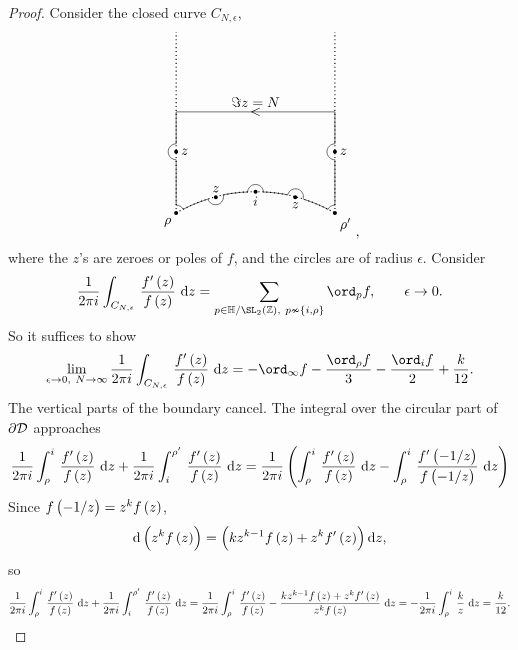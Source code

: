 \begin{proof}
Consider the closed curve $ C_{N, \epsilon} $,
$$
\begin{tikzpicture}[scale=4]
\draw [dotted, thick] (-0.5, 0.866) arc (120:60:1);
\draw [dotted, thick] (-0.5, 0.866) to (-0.5, 2);
\draw [dotted, thick] (0.5, 0.866) to (0.5, 2);
\draw (-0.5, 0.916) arc (90:25:0.05);
\draw (-0.455, 0.89) arc (117:107.5:1);
\draw (-0.3, 0.955) arc (-165:15:0.05);
\draw (-0.205, 0.98) arc (101:92:1);
\draw (-0.05, 0.995) arc (180:0:0.05);
\draw (0.205, 0.98) arc (79:88:1);
\draw (0.3, 0.955) arc (-15:165:0.05);
\draw (0.455, 0.89) arc (63:72.5:1);
\draw (0.5, 0.916) arc (90:155:0.05);
\draw (-0.5, 1.5) to node[above]{$ \Im z = N $} node{$ < $} (0.5, 1.5);
\draw (-0.5, 0.916) to (-0.5, 1.2);
\draw (-0.5, 1.2) arc (270:90:0.05);
\draw (-0.5, 1.3) to (-0.5, 1.5);
\draw (0.5, 0.916) to (0.5, 1.2);
\draw (0.5, 1.2) arc (270:90:0.05);
\draw (0.5, 1.3) to (0.5, 1.5);
\fill (0, 1) circle (0.0125) node[below]{$ i $};
\fill (-0.25, 0.965) circle (0.0125) node[above]{$ z $};
\fill (0.25, 0.965) circle (0.0125) node[below]{$ z $};
\fill (-0.5, 1.25) circle (0.0125) node[right]{$ z $};
\fill (-0.5, 0.866) circle (0.0125) node[below left]{$ \rho $};
\fill (0.5, 1.25) circle (0.0125) node[right]{$ z $};
\fill (0.5, 0.866) circle (0.0125) node[below right]{$ \rho' $};
\end{tikzpicture},
$$
where the $ z $'s are zeroes or poles of $ f $, and the circles are of radius $ \epsilon $. Consider
$$ \dfrac{1}{2\pi i}\intd{C_{N, \epsilon}}{}{\dfrac{f'\br{z}}{f\br{z}}}{z} = \sum_{p \in \HH / \SL_2\br{\ZZ}, \ p \nsim \cbr{i, \rho}} \ord_p f, \qquad \epsilon \to 0. $$
So it suffices to show
$$ \lim_{\epsilon \to 0, \ N \to \infty} \dfrac{1}{2\pi i}\intd{C_{N, \epsilon}}{}{\dfrac{f'\br{z}}{f\br{z}}}{z} = -\ord_\infty f - \dfrac{\ord_\rho f}{3} - \dfrac{\ord_i f}{2} + \dfrac{k}{12}. $$
The vertical parts of the boundary cancel. The integral over the circular part of $ \partial\mathcal{D} $ approaches
$$ \dfrac{1}{2\pi i}\intd{\rho}{i}{\dfrac{f'\br{z}}{f\br{z}}}{z} + \dfrac{1}{2\pi i}\intd{i}{\rho'}{\dfrac{f'\br{z}}{f\br{z}}}{z} = \dfrac{1}{2\pi i}\br{\intd{\rho}{i}{\dfrac{f'\br{z}}{f\br{z}}}{z} - \intd{\rho}{i}{\dfrac{f'\br{-1 / z}}{f\br{-1 / z}}}{z}} $$
Since $ f\br{-1 / z} = z^kf\br{z} $,
$$ \d\br{z^kf\br{z}} = \br{kz^{k - 1}f\br{z} + z^kf'\br{z}}\d z, $$
so
$$ \dfrac{1}{2\pi i}\intd{\rho}{i}{\dfrac{f'\br{z}}{f\br{z}}}{z} + \dfrac{1}{2\pi i}\intd{i}{\rho'}{\dfrac{f'\br{z}}{f\br{z}}}{z} = \dfrac{1}{2\pi i}\intd{\rho}{i}{\dfrac{f'\br{z}}{f\br{z}} - \dfrac{kz^{k - 1}f\br{z} + z^kf'\br{z}}{z^kf\br{z}}}{z} = -\dfrac{1}{2\pi i}\intd{\rho}{i}{\dfrac{k}{z}}{z} = \dfrac{k}{12}. $$

\end{proof}
